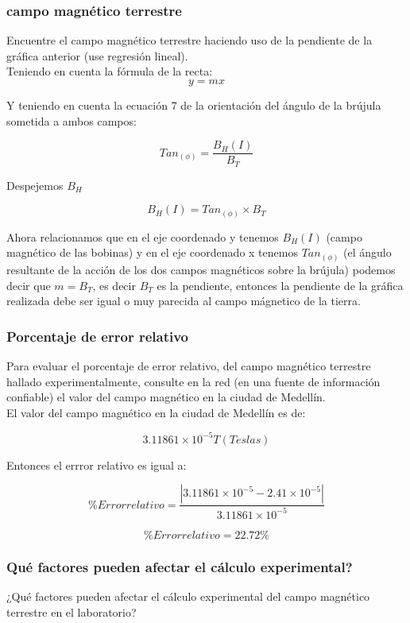\subsubsection{campo magnético terrestre}
Encuentre el campo magnético terrestre haciendo uso de la pendiente de la
gráfica anterior (use regresión lineal).\\

Teniendo en cuenta la fórmula de la recta:
\[ y = mx\]

Y teniendo en cuenta la ecuación 7 de la orientación del ángulo de la brújula
sometida a ambos campos:

\[ Tan_{(\phi)} = \frac{B_{H}(I)}{B_{T}} \]

Despejemos $B_{H}$

\[ B_{H}(I) = Tan_{(\phi)} \times B_{T} \]

Ahora relacionamos que en el eje coordenado y tenemos $B_{H}(I)$ (campo
magnético de las bobinas) y en el eje coordenado x tenemos $Tan_{(\phi)}$ (el
ángulo resultante de la acción de los dos campos magnéticos sobre la brújula)
podemos decir que $m = B_{T}$, es decir $B_{T}$ es la pendiente, entonces la
pendiente de la gráfica realizada debe ser igual o muy parecida al campo
mágnetico de la tierra.


\subsubsection{Porcentaje de error relativo}
Para evaluar el porcentaje de error relativo, del campo magnético terrestre
hallado experimentalmente, consulte en la red (en una fuente de información
confiable) el valor del campo magnético en la ciudad de Medellín.\\

El valor del campo magnético en la ciudad de Medellín es de:

\[ 3.11861\times10^{-5} T (Teslas)\]

Entonces el errror relativo es igual a:

\[ \%Error relativo = \frac{|3.11861\times10^{-5} - 2.41\times10^{-5}|}{3.11861\times10^{-5}}\]

\[ \%Error relativo = 22.72\%\]


\subsubsection{Qué factores pueden afectar el cálculo experimental?}
¿Qué factores pueden afectar el cálculo experimental del campo magnético
terrestre en el laboratorio?

